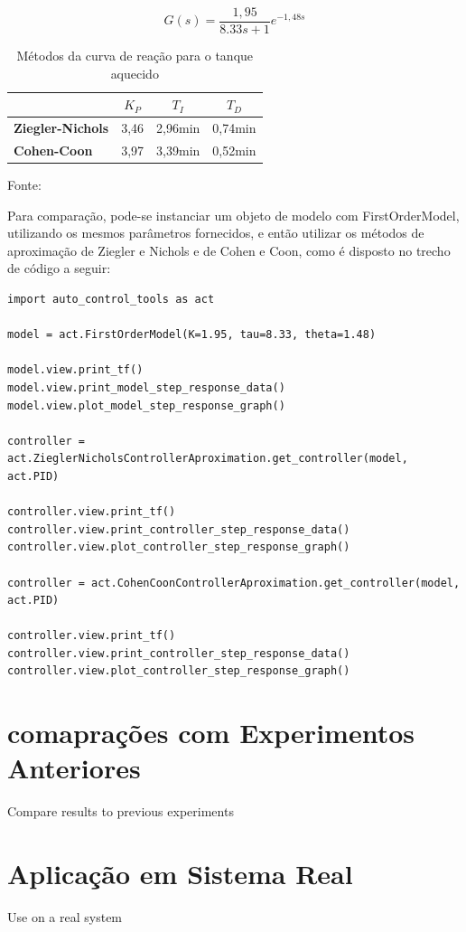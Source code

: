 \begin{equation}
    \label{eq:bib_comp_1_model}
    G(s) = \frac{1,95}{8.33 s + 1}e^{-1,48 s}
\end{equation}

\begin{table}[h]
    \begin{center}
        \begin{tabular}{ | l | c | c | c | }
            \hline
            {}                         & {$K_P$} & {$T_I$}   & {$T_D$}   \\
            \hline
            {\textbf{Ziegler-Nichols}} & {3,46}  & {2,96min} & {0,74min} \\
            \hline
            {\textbf{Cohen-Coon}}      & {3,97}  & {3,39min} & {0,52min} \\
            \hline
        \end{tabular}
        \caption{ Métodos da curva de reação para o tanque aquecido}
        \vspace{0cm}\hspace{0cm}\small{Fonte: \cite{apostpidsint}}
        \label{tab:bib_comp_1_restb}
    \end{center}
\end{table}

Para comparação, pode-se instanciar um objeto de modelo com FirstOrderModel, utilizando os mesmos parâmetros fornecidos,
e então utilizar os métodos de aproximação de Ziegler e Nichols e de Cohen e Coon, como é disposto no trecho de código
a seguir:
\begin{lstlisting}[label={lst:bib_comp_1_code1}]
import auto_control_tools as act

model = act.FirstOrderModel(K=1.95, tau=8.33, theta=1.48)

model.view.print_tf()
model.view.print_model_step_response_data()
model.view.plot_model_step_response_graph()

controller = act.ZieglerNicholsControllerAproximation.get_controller(model, act.PID)

controller.view.print_tf()
controller.view.print_controller_step_response_data()
controller.view.plot_controller_step_response_graph()

controller = act.CohenCoonControllerAproximation.get_controller(model, act.PID)

controller.view.print_tf()
controller.view.print_controller_step_response_data()
controller.view.plot_controller_step_response_graph()
\end{lstlisting}


\section{comaprações com Experimentos Anteriores}

Compare results to previous experiments


\section{Aplicação em Sistema Real}

Use on a real system
